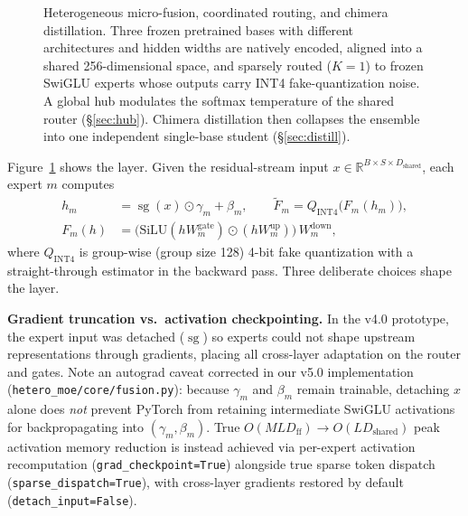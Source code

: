 \documentclass[10pt]{article}
\newcommand{\stopgrad}{\operatorname{sg}}
\newcommand{\R}{\mathbb{R}}
\theoremstyle{definition}
\theoremstyle{plain}
\theoremstyle{remark}
\begin{document}
\begin{figure}[htbp]
{}%
\caption{Heterogeneous micro-fusion, coordinated routing, and chimera distillation. Three frozen pretrained bases with different architectures and hidden widths are natively encoded, aligned into a shared 256-dimensional space, and sparsely routed ($K{=}1$) to frozen SwiGLU experts whose outputs carry INT4 fake-quantization noise. A global hub modulates the softmax temperature of the shared router (\S\ref{sec:hub}). Chimera distillation then collapses the ensemble into one independent single-base student (\S\ref{sec:distill}).}
\label{fig:overview}
\end{figure}

Figure~\ref{fig:overview} shows the layer. Given the residual-stream input $x \in \R^{B \times S \times D_{\text{shared}}}$, each expert $m$ computes
\begin{align}
\label{eq:expert}
h_m &= \stopgrad(x) \odot \gamma_m + \beta_m, \qquad
\tilde F_m = Q_{\text{INT4}}\big(F_m(h_m)\big), \\
F_m(h) &= \big(\mathrm{SiLU}(h W^{\text{gate}}_m) \odot (h W^{\text{up}}_m)\big)\, W^{\text{down}}_m,
\end{align}
where $Q_{\text{INT4}}$ is group-wise (group size 128) 4-bit fake quantization with a straight-through estimator in the backward pass. Three deliberate choices shape the layer.

\textbf{Gradient truncation vs.\ activation checkpointing.} In the v4.0 prototype, the expert input was detached ($\stopgrad$) so experts could not shape upstream representations through gradients, placing all cross-layer adaptation on the router and gates. Note an autograd caveat corrected in our v5.0 implementation (\texttt{hetero\_moe/core/fusion.py}): because $\gamma_m$ and $\beta_m$ remain trainable, detaching $x$ alone does \emph{not} prevent PyTorch from retaining intermediate SwiGLU activations for backpropagating into $(\gamma_m, \beta_m)$. True $O(M L D_{\text{ff}}) \to O(L D_{\text{shared}})$ peak activation memory reduction is instead achieved via per-expert activation recomputation (\texttt{grad\_checkpoint=True}) alongside true sparse token dispatch (\texttt{sparse\_dispatch=True}), with cross-layer gradients restored by default (\texttt{detach\_input=False}).
\end{document}
